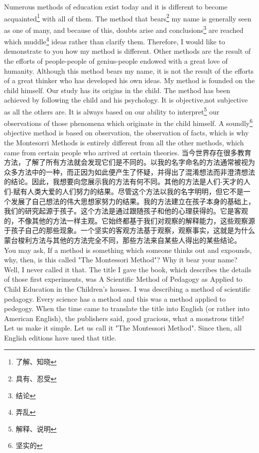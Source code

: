 \documentclass[lang=cn,10pt]{elegantbook}
\begin{document}
Numerous methods of education exist today and it is different to become acquainted\footnote{了解、知晓} with all of them. The method that bears\footnote{具有、忍受} my name is generally seen as one of many, and because of this, doubts arise and conclusions\footnote{结论} are reached which muddle\footnote{弄乱} ideas rather than clarify them. Therefore, I would like to demonstrate to you how my method is different. Other methods are the result of the efforts of people-people of genius-people endowed with a great love of humanity. Although this method bears my name, it is not the result of the efforts of a great thinker who has developed his own ideas. My method is founded on the child himself. Our study has its origins in the child. The method has been achieved by following the child and his psychology. It is objective,not subjective as all the others are. It is always based on our ability to interpret\footnote{解释、说明} our observations of those phenomena which originate in the child himself. A soundly\footnote{坚实的} objective method is based on observation, the observation of facts, which is why the Montesorri Methods is entirely different from all the other methods, which came from certain people who arrived at certain theories.
当今世界存在很多教育方法，了解了所有方法就会发现它们是不同的。以我的名字命名的方法通常被视为众多方法中的一种，而正因为如此便产生了怀疑，并得出了混淆想法而非澄清想法的结论。因此，我想要向您展示我的方法有何不同。其他的方法是人们-天才的人们-赋有人类大爱的人们努力的结果。尽管这个方法以我的名字明明，但它不是一个发展了自己想法的伟大思想家努力的结果。我的方法建立在孩子本身的基础上，我们的研究起源于孩子。这个方法是通过跟随孩子和他的心理获得的。它是客观的，不像其他的方法一样主观。它始终都基于我们对观察的解释能力，这些观察源于孩子自己的那些现象。一个坚实的客观方法基于观察，观察事实，这就是为什么蒙台梭利方法与其他的方法完全不同，那些方法来自某些人得出的某些结论。
You may ask, If a method is something which someone thinks out and expounds, why, then, is this called "The Montessori Method"? Why it bear your name? Well, I never called it that. The title I gave the book, which describes the details of those first experiments, was A Scientific Method of Pedagogy as Applied to Child Education in the Children's houses. I was describing a method of scientific pedagogy. Every science has a method and this was a method applied to pedegogy. When the time came to translate the title into English (or rather into American English), the publishers said, good gracious, what a monstrous title! Let us make it simple. Let us call it "The Montessori Method". Since then, all English editions have used that title. 
\end{document}
